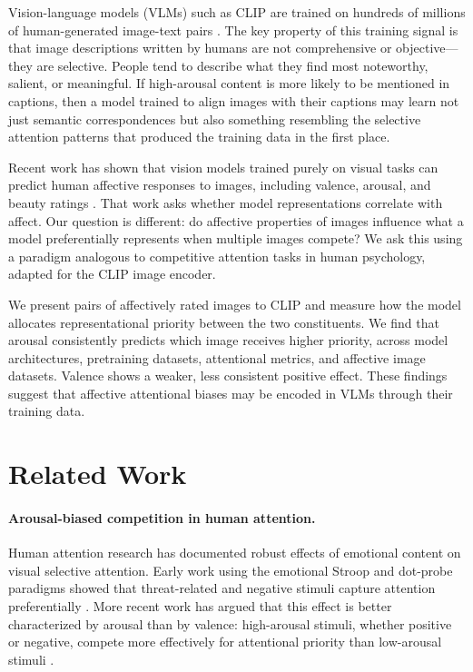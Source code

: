 \documentclass[12pt]{article}
\begin{document}
Vision-language models (VLMs) such as CLIP are trained on hundreds of millions of human-generated image-text pairs \citep{radfordLearningTransferableVisual2021a}. The key property of this training signal is that image descriptions written by humans are not comprehensive or objective---they are selective. People tend to describe what they find most noteworthy, salient, or meaningful. If high-arousal content is more likely to be mentioned in captions, then a model trained to align images with their captions may learn not just semantic correspondences but also something resembling the selective attention patterns that produced the training data in the first place.

Recent work has shown that vision models trained purely on visual tasks can predict human affective responses to images, including valence, arousal, and beauty ratings \citep{conwellPerceptualPrimacyFeeling2025}. That work asks whether model representations correlate with affect. Our question is different: do affective properties of images influence what a model preferentially represents when multiple images compete? We ask this using a paradigm analogous to competitive attention tasks in human psychology, adapted for the CLIP image encoder.

We present pairs of affectively rated images to CLIP and measure how the model allocates representational priority between the two constituents. We find that arousal consistently predicts which image receives higher priority, across model architectures, pretraining datasets, attentional metrics, and affective image datasets. Valence shows a weaker, less consistent positive effect. These findings suggest that affective attentional biases may be encoded in VLMs through their training data.

\section{Related Work}

\paragraph{Arousal-biased competition in human attention.}
Human attention research has documented robust effects of emotional content on visual selective attention. Early work using the emotional Stroop and dot-probe paradigms showed that threat-related and negative stimuli capture attention preferentially \citep{macleodAttentionalBiasEmotional1986, prattoAutomaticVigilanceAttentiongrabbing1991}. More recent work has argued that this effect is better characterized by arousal than by valence: high-arousal stimuli, whether positive or negative, compete more effectively for attentional priority than low-arousal stimuli \citep{sutherlandArousalNotValence2018, matherArousalBiasedCompetitionPerception2011}.
\end{document}
